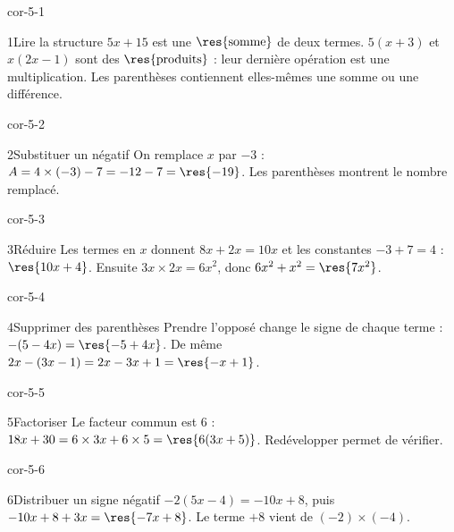 \clearpage\pagestyle{otMain}\setlength{\otBlocEspacement}{2.5mm}\fontsize{11}{15}\selectfont{}
\begin{blocLivre}{cor-5-1}\begin{corrige}{1}{Lire la structure}
$5x+15$ est une $\res{\text{somme}}$ de deux termes. $5(x+3)$ et $x(2x-1)$ sont des $\res{\text{produits}}$ : leur dernière opération est une multiplication. Les parenthèses contiennent elles-mêmes une somme ou une différence.
\end{corrige}\end{blocLivre}
\begin{blocLivre}{cor-5-2}\begin{corrige}{2}{Substituer un négatif}
On remplace $x$ par $-3$ : $A=4\times(-3)-7=-12-7=\res{-19}$. Les parenthèses montrent le nombre remplacé.
\end{corrige}\end{blocLivre}
\begin{blocLivre}{cor-5-3}\begin{corrige}{3}{Réduire}
Les termes en $x$ donnent $8x+2x=10x$ et les constantes $-3+7=4$ : $\res{10x+4}$. Ensuite $3x\times2x=6x^2$, donc $6x^2+x^2=\res{7x^2}$.
\end{corrige}\end{blocLivre}
\begin{blocLivre}{cor-5-4}\begin{corrige}{4}{Supprimer des parenthèses}
Prendre l’opposé change le signe de chaque terme : $-(5-4x)=\res{-5+4x}$. De même $2x-(3x-1)=2x-3x+1=\res{-x+1}$.
\end{corrige}\end{blocLivre}
\begin{blocLivre}{cor-5-5}\begin{corrige}{5}{Factoriser}
Le facteur commun est 6 : $18x+30=6\times3x+6\times5=\res{6(3x+5)}$. Redévelopper permet de vérifier.
\end{corrige}\end{blocLivre}
\begin{blocLivre}{cor-5-6}\begin{corrige}{6}{Distribuer un signe négatif}
$-2(5x-4)=-10x+8$, puis $-10x+8+3x=\res{-7x+8}$. Le terme $+8$ vient de $(-2)\times(-4)$.
\end{corrige}\end{blocLivre}
